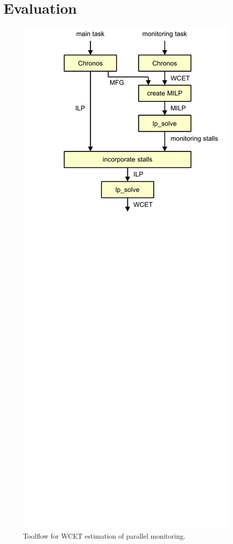 \section{Evaluation}
\label{sec:monitoring_wcet.evaluation}

\begin{figure}
  \begin{center}
    \includegraphics{monitoring_wcet/figs/toolflow.pdf}
    \caption{Toolflow for WCET estimation of parallel monitoring.}
    \label{fig:monitoring_wcet.evaluation.toolflow}
  \end{center}
\end{figure}

